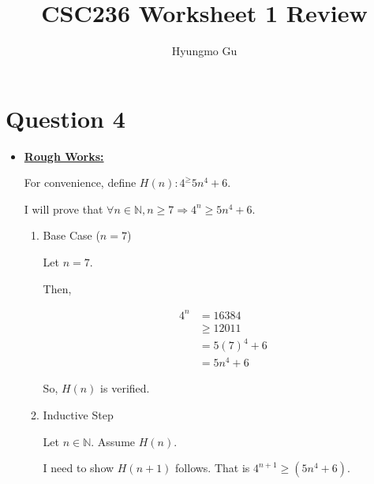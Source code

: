 \documentclass[12pt]{article}
\begin{document}
\title{CSC236 Worksheet 1 Review}
\author{Hyungmo Gu}
\maketitle

\section*{Question 4}
\begin{itemize}
    \item

    \begin{mdframed}
        \underline{\textbf{Rough Works:}}

        \bigskip

        For convenience, define $H(n): 4^ \geq 5n^4 + 6$.

        \bigskip

        I will prove that $\forall n \in \mathbb{N}, n \geq 7 \Rightarrow 4^n \geq 5n^4 + 6$.

        \begin{enumerate}[1.]
            \item Base Case ($n = 7$)

            \begin{mdframed}
            Let $n = 7$.

            \bigskip

            Then,

            \begin{align}
                4^n &= 16384\\
                &\geq 12011\\
                &= 5(7)^4 + 6\\
                &= 5n^4 + 6
            \end{align}

            \bigskip

            So, $H(n)$ is verified.
            \end{mdframed}

            \item Inductive Step

            \begin{mdframed}
            Let $n \in \mathbb{N}$. Assume $H(n)$.

            \bigskip

            I need to show $H(n+1)$ follows. That is $4^{n+1} \geq (5n^4 + 6)$.


\end{mdframed}
\end{enumerate}
\end{mdframed}
\end{itemize}
\end{document}
